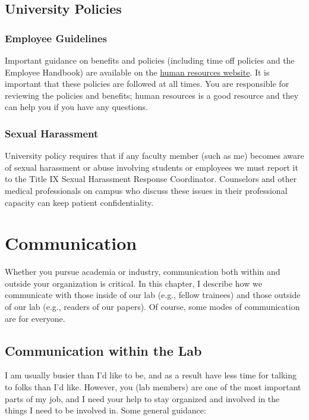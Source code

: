 \documentclass[letterpaper,11pt,oneside]{memoir}
\begin{document}
\section{University Policies}

\subsection{Employee Guidelines}
Important guidance on benefits and policies (including time off policies and the Employee Handbook) are available on the \href{https://www.temple.edu/faculty-and-staff/working-temple/human-resources}{human resources website}. It is important that these policies are followed at all times. You are responsible for reviewing the policies and benefits; human resources is a good resource and they can help you if you have any questions.

\subsection{Sexual Harassment}
University policy requires that if any faculty member (such as me) becomes aware of sexual harassment or abuse involving students or employees we must report it to the Title IX Sexual Harassment Response Coordinator. Counselors and other medical professionals on campus who discuss these issues in their professional capacity can keep patient confidentiality.



\chapter{Communication}

Whether you pursue academia or industry, communication both within and outside your organization is critical. In this chapter, I describe how we communicate with those inside of our lab (e.g., fellow trainees) and those outside of our lab (e.g., readers of our papers). Of course, some modes of communication are for everyone.

\section{Communication within the Lab}
\label{sec:communicationInLab}

I am usually busier than I'd like to be, and as a result have less time for talking to folks than I'd like. However, you (lab members) are one of the most important parts of my job, and I need your help to stay organized and involved in the things I need to be involved in. Some general guidance:
\end{document}
